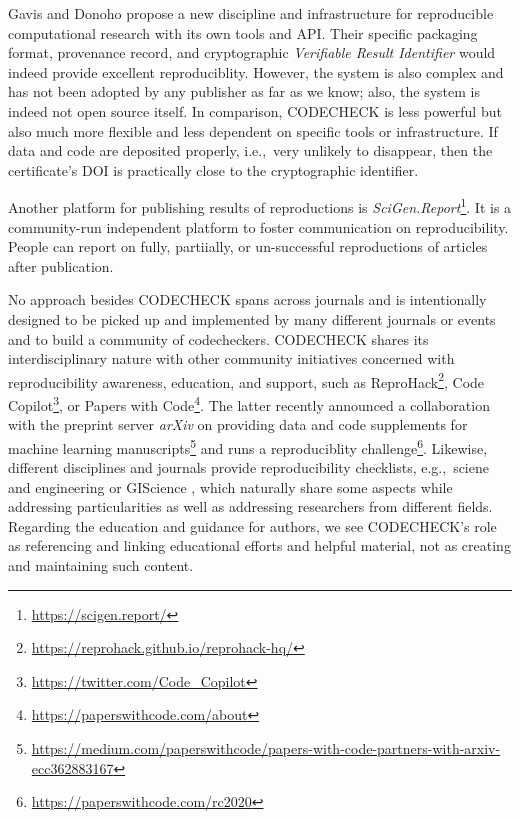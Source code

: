 \documentclass[12pt]{article}
\begin{document}
Gavis and Donoho \cite{gavish_universal_2011} propose a new discipline and 
infrastructure for reproducible computational research with its own tools and
API. Their specific packaging format, provenance record, and cryptographic
\emph{Verifiable Result Identifier} would indeed provide excellent
reproduciblity. However, the system is also complex and has not been adopted by
any publisher as far as we know; also, the system is indeed not open source itself.
In comparison, CODECHECK is less powerful but also much more flexible and
less dependent on specific tools or infrastructure. If data and code are 
deposited properly, i.e.,~very unlikely to disappear, then the certificate's 
DOI is practically close to the cryptographic identifier.

Another platform for publishing results of reproductions is \emph{SciGen.Report}\footnote{\url{https://scigen.report/}}.
It is a community-run independent platform to foster communication on reproducibility.
People can report on fully, partiially, or un-successful reproductions of articles after publication.

No approach besides CODECHECK spans across journals and is
intentionally designed to be picked up and implemented by many different 
journals or events and to build a community of codecheckers. CODECHECK shares
its interdisciplinary nature with other community initiatives concerned with 
reproducibility awareness, education, and support, such as
ReproHack\footnote{\url{https://reprohack.github.io/reprohack-hq/}},
Code Copilot\footnote{\url{https://twitter.com/Code_Copilot}}, or Papers with Code\footnote{\url{https://paperswithcode.com/about}}.
The latter recently announced a collaboration with the preprint server
\emph{arXiv} on providing data and code supplements for machine learning
manuscripts\footnote{\url{https://medium.com/paperswithcode/papers-with-code-partners-with-arxiv-ecc362883167}} and runs a reproduciblity challenge\footnote{\url{https://paperswithcode.com/rc2020}}.
Likewise, different disciplines and journals provide reproducibility
checklists, e.g.,~sciene and engineering \cite{rosenberg_next_2020} or GIScience \cite{nust_agile_2019}, which naturally share some
aspects while addressing particularities as well as addressing researchers
from different fields. Regarding the education and guidance for authors, 
we see CODECHECK's role as referencing and linking educational efforts
and helpful material, not as creating and maintaining such content.
\end{document}
